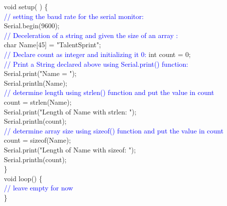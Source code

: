 \documentclass[12pt,a4paper]{article}
\begin{document}
void setup( ) \{\\
  \textcolor{blue}{// setting the baud rate for the serial monitor:}\\
  Serial.begin(9600);\\
 \textcolor{blue}{// Deceleration of a string and given the size of an array : }\\
 char Name[45] = "TalentSprint"; \\
 \textcolor{blue}{// Declare count as integer and initializing it 0: } 
  int  count = 0;\\
 \textcolor{blue}{// Print a String declared above using Serial.print() function:}\\
  Serial.print("Name = ");\\
  Serial.println(Name);\\
  \textcolor{blue}{// determine length using strlen() function and put the value in count}\\
  count = strlen(Name);\\
  Serial.print("Length of Name with strlen: ");\\
  Serial.println(count);\\
  \textcolor{blue}{// determine array size using sizeof() function and put the value in count}\\
  count = sizeof(Name);\\
  Serial.print("Length of Name with sizeof: ");\\
  Serial.println(count);\\
\}\\
void loop() \{\\
  \textcolor{blue}{// leave empty for now}\\
\}\\
\end{document}
